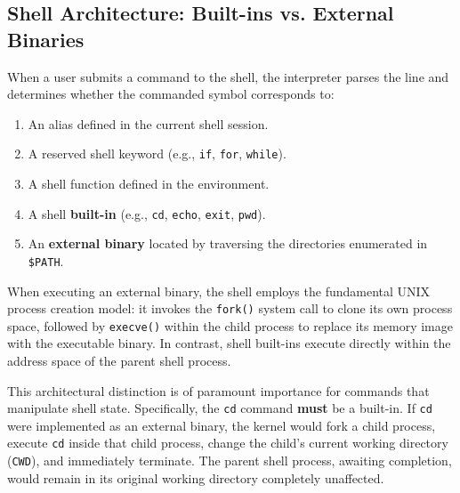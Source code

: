 \documentclass[12pt,a4paper]{article}
\begin{document}
\subsection{Shell Architecture: Built-ins vs. External Binaries}
When a user submits a command to the shell, the interpreter parses the line and determines whether the commanded symbol corresponds to:
\begin{enumerate}
    \item An alias defined in the current shell session.
    \item A reserved shell keyword (e.g., \texttt{if}, \texttt{for}, \texttt{while}).
    \item A shell function defined in the environment.
    \item A shell \textbf{built-in} (e.g., \texttt{cd}, \texttt{echo}, \texttt{exit}, \texttt{pwd}).
    \item An \textbf{external binary} located by traversing the directories enumerated in \texttt{\$PATH}.
\end{enumerate}

When executing an external binary, the shell employs the fundamental UNIX process creation model: it invokes the \texttt{fork()} system call to clone its own process space, followed by \texttt{execve()} within the child process to replace its memory image with the executable binary. In contrast, shell built-ins execute directly within the address space of the parent shell process.

This architectural distinction is of paramount importance for commands that manipulate shell state. Specifically, the \texttt{cd} command \textbf{must} be a built-in. If \texttt{cd} were implemented as an external binary, the kernel would fork a child process, execute \texttt{cd} inside that child process, change the child's current working directory (\texttt{CWD}), and immediately terminate. The parent shell process, awaiting completion, would remain in its original working directory completely unaffected.
\end{document}
